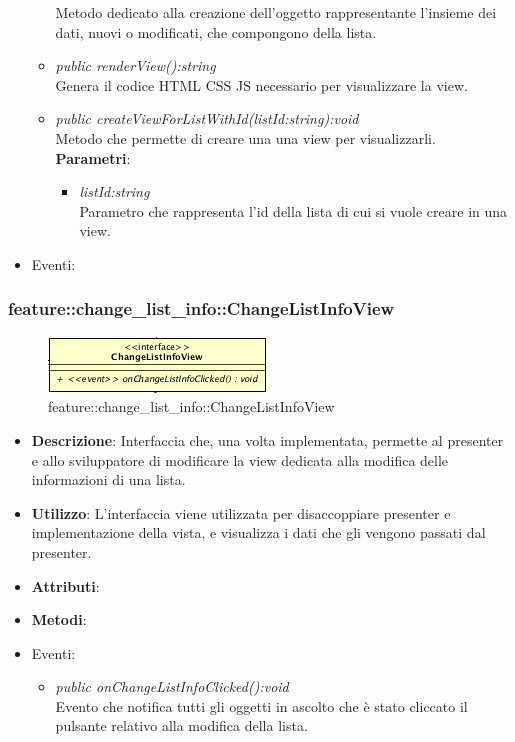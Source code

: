 \begin{itemize}
\begin{itemize}
	 	Metodo dedicato alla creazione dell'oggetto rappresentante l'insieme dei dati, nuovi o modificati, che compongono della lista.
	\item \textit{public renderView():string}\\
	Genera il codice HTML CSS JS necessario per visualizzare la view.
	\item \textit{public createViewForListWithId(listId:string):void}\\
		Metodo che permette di creare una una view per visualizzarli.
			\\ \textbf{Parametri}: \begin{itemize}
			\item \textit{listId:string}\\
			Parametro che rappresenta l'id della lista di cui si vuole creare in una view.
			\end{itemize} 
	\end{itemize}
\item{Eventi}:
\end{itemize}

\subsubsection{feature::change\_list\_info::ChangeListInfoView}

\label{feature::change_list_info::ChangeListInfoView}
\begin{figure}[ht]
	\centering
	\includegraphics[scale=0.5]{Sezioni/SottosezioniST/img/app/ChangeListInfoView.png}
	\caption{feature::change\_list\_info::ChangeListInfoView}
\end{figure}

\begin{itemize}
\item \textbf{Descrizione}: Interfaccia che, una volta implementata, permette al presenter e allo sviluppatore di modificare la view dedicata alla modifica delle informazioni di una lista.
\item \textbf{Utilizzo}: L'interfaccia viene utilizzata per disaccoppiare presenter e implementazione della vista, e visualizza i dati che gli vengono passati dal presenter.
\item \textbf{Attributi}: 
\item \textbf{Metodi}:
\item{Eventi}:
	\begin{itemize}	
	\item \textit{public onChangeListInfoClicked():void}\\
		Evento che notifica tutti gli oggetti in ascolto che è stato cliccato il pulsante relativo alla modifica della lista.
	\end{itemize}
\end{itemize}

